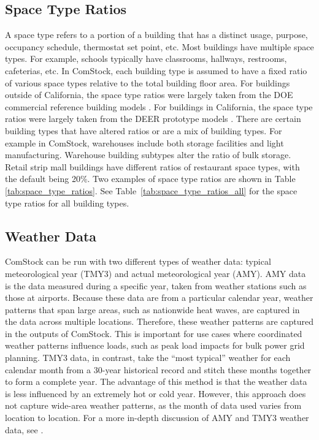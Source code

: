 \subsection{Space Type Ratios}
\label{sec:space_type_ratios}
A space type refers to a portion of a building that has a distinct usage, purpose, occupancy schedule, thermostat set point, etc. Most buildings have multiple space types. For example, schools typically have classrooms, hallways, restrooms, cafeterias, etc. In ComStock, each building type is assumed to have a fixed ratio of various space types relative to the total building floor area. For buildings outside of California, the space type ratios were largely taken from the DOE commercial reference building models \citep{deru_2011}. For buildings in California, the space type ratios were largely taken from the DEER prototype models \citep{cpuc_deer}. There are certain building types that have altered ratios or are a mix of building types. For example in ComStock, warehouses include both storage facilities and light manufacturing. Warehouse building subtypes alter the ratio of bulk storage. Retail strip mall buildings have different ratios of restaurant space types, with the default being 20\%. Two examples of space type ratios are shown in Table \ref{tab:space_type_ratios}. See Table~\ref{tab:space_type_ratios_all} for the space type ratios for all building types.



\subsection{Weather Data}
ComStock can be run with two different types of weather data: typical meteorological year (TMY3) and actual meteorological year (AMY). AMY data is the data measured during a specific year, taken from weather stations such as those at airports. Because these data are from a particular calendar year, weather patterns that span large areas, such as nationwide heat waves, are captured in the data across multiple locations. Therefore, these weather patterns are captured in the outputs of ComStock. This is important for use cases where coordinated weather patterns influence loads, such as peak load impacts for bulk power grid planning. TMY3 data, in contrast, take the ``most typical'' weather for each calendar month from a 30-year historical record and stitch these months together to form a complete year. The advantage of this method is that the weather data is less influenced by an extremely hot or cold year. However, this approach does not capture wide-area weather patterns, as the month of data used varies from location to location. For a more in-depth discussion of AMY and TMY3 weather data, see \cite{eulp_final_report}.

